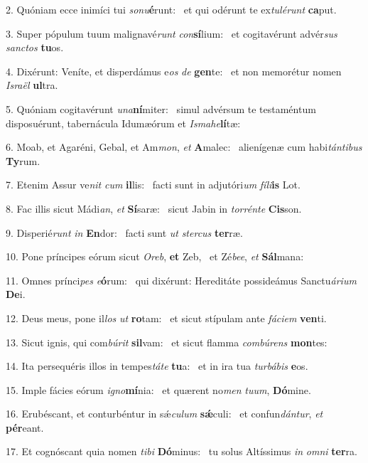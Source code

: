 2. Quóniam ecce inimíci tui \textit{so}\textit{nu}\textbf{é}runt: \ast\  et qui odérunt te ex\textit{tu}\textit{lé}\textit{runt} \textbf{ca}put.\

3. Super pópulum tuum malignavé\textit{runt} \textit{con}\textbf{sí}lium: \ast\  et cogitavérunt advér\textit{sus} \textit{sanc}\textit{tos} \textbf{tu}os.\

4. Dixérunt: Veníte, et disperdámus e\textit{os} \textit{de} \textbf{gen}te: \ast\  et non memorétur nomen \textit{Is}\textit{ra}\textit{ël} \textbf{ul}tra.\

5. Quóniam cogitavérunt \textit{u}\textit{na}\textbf{ní}miter: \ast\  simul advérsum te testaméntum disposuérunt, tabernácula Idumæórum et \textit{Is}\textit{ma}\textit{he}\textbf{lí}tæ:\

6. Moab, et Agaréni, Gebal, et Am\textit{mon}, \textit{et} \textbf{A}malec: \ast\  alienígenæ cum habi\textit{tán}\textit{ti}\textit{bus} \textbf{Ty}rum.\

7. Etenim Assur ve\textit{nit} \textit{cum} \textbf{il}lis: \ast\  facti sunt in adjutóri\textit{um} \textit{fí}\textit{li}\textbf{is} Lot.\

8. Fac illis sicut Mádi\textit{an}, \textit{et} \textbf{Sí}saræ: \ast\  sicut Jabin in \textit{tor}\textit{rén}\textit{te} \textbf{Cis}son.\

9. Disperié\textit{runt} \textit{in} \textbf{En}dor: \ast\  facti sunt \textit{ut} \textit{ster}\textit{cus} \textbf{ter}ræ.\

10. Pone príncipes eórum sicut \textit{O}\textit{reb}, \textbf{et} Zeb, \ast\  et Zé\textit{be}\textit{e}, \textit{et} \textbf{Sál}mana:\

11. Omnes prínci\textit{pes} \textit{e}\textbf{ó}rum: \ast\  qui dixérunt: Hereditáte possideámus Sanctu\textit{á}\textit{ri}\textit{um} \textbf{De}i.\

12. Deus meus, pone il\textit{los} \textit{ut} \textbf{ro}tam: \ast\  et sicut stípulam ante \textit{fá}\textit{ci}\textit{em} \textbf{ven}ti.\

13. Sicut ignis, qui com\textit{bú}\textit{rit} \textbf{sil}vam: \ast\  et sicut flamma \textit{com}\textit{bú}\textit{rens} \textbf{mon}tes:\

14. Ita persequéris illos in tempes\textit{tá}\textit{te} \textbf{tu}a: \ast\  et in ira tua \textit{tur}\textit{bá}\textit{bis} \textbf{e}os.\

15. Imple fácies eórum \textit{i}\textit{gno}\textbf{mí}nia: \ast\  et quærent no\textit{men} \textit{tu}\textit{um}, \textbf{Dó}mine.\

16. Erubéscant, et conturbéntur in sǽ\textit{cu}\textit{lum} \textbf{sǽ}culi: \ast\  et confun\textit{dán}\textit{tur}, \textit{et} \textbf{pér}eant.\

17. Et cognóscant quia nomen \textit{ti}\textit{bi} \textbf{Dó}minus: \ast\  tu solus Altíssimus \textit{in} \textit{om}\textit{ni} \textbf{ter}ra.\

